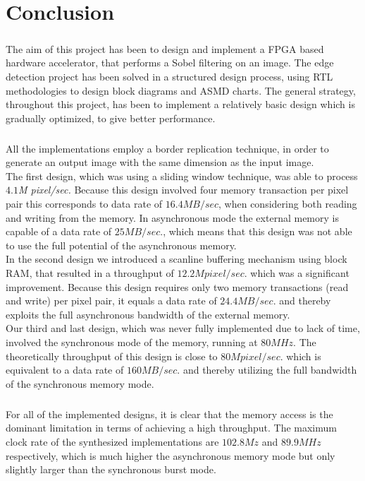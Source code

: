 \chapter{Conclusion}
\paragraph*{ }
The aim of this project has been to design and implement a FPGA based hardware accelerator, that performs a Sobel filtering on an image.
The edge detection project has been solved in a structured design process, using RTL methodologies to design block diagrams and  ASMD charts. The general strategy, throughout this project, has been to implement a relatively basic design which is gradually  optimized, to give better performance.
\paragraph*{ }
All the implementations employ a border replication technique, in order to generate an output image with the same dimension as the input image.\\
The first design, which was using a sliding window technique, was able to process $4.1$\textit{M pixel/sec.} Because this design involved four memory transaction per pixel pair this corresponds to data rate of $16.4MB/sec$, when considering both reading and writing from the memory. In asynchronous mode the external memory is capable of a data rate of $25MB/sec.$, which means that this design was not able to use the full potential of the asynchronous memory.\\
In the second design we introduced a scanline buffering mechanism using block RAM, that resulted in a throughput of $12.2M pixel/sec.$ which was a significant improvement. Because this design requires only two memory transactions (read and write) per pixel pair, it equals a data rate of $24.4MB/sec.$ and thereby exploits the full asynchronous bandwidth of the external memory. \\
Our third and last design, which was never fully implemented due to lack of time, involved the synchronous mode of the memory, running at $80MHz$. The theoretically throughput of this design is close to $80M pixel/sec.$ which is equivalent to a data rate of $160MB/sec.$ and thereby utilizing the full bandwidth of the synchronous memory mode.
\paragraph*{ }
For all of the implemented designs, it is clear that the memory access is the dominant limitation in terms of achieving a high throughput. The maximum clock rate of the synthesized implementations are $102.8Mz$ and $89.9MHz$ respectively, which is much higher the asynchronous memory mode but only slightly larger than the synchronous burst mode.



\newpage